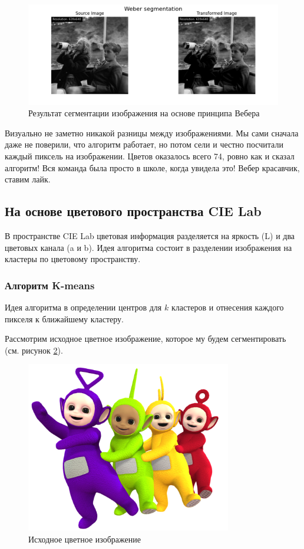 \begin{figure}[ht!]
    \centering
    \includegraphics[width=\textwidth]{../results/Weber segmentation.png}
    \caption{Результат сегментации изображения на основе принципа Вебера}
    \label{img:weber_segmentation}
\end{figure}

Визуально не заметно никакой разницы между изображениями. Мы сами сначала даже не поверили, 
что алгоритм работает, но потом сели и честно посчитали каждый пиксель на изображении. 
Цветов оказалось всего 74, ровно как и сказал алгоритм! Вся команда была просто в школе, когда увидела это! 
Вебер красавчик, ставим лайк. 

\subsection{На основе цветового пространства CIE Lab}

В пространстве CIE Lab цветовая информация разделяется на яркость (L) и два цветовых канала (a и b).
Идея алгоритма состоит в разделении изображения на кластеры по цветовому пространству.

\subsubsection{Алгоритм K-means}

Идея алгоритма в определении центров для $k$ кластеров и отнесения каждого пикселя к ближайшему кластеру.

Рассмотрим исходное цветное изображение, которое му будем сегментировать (см. рисунок \ref{img:source_color}).

\begin{figure}[ht!]
    \centering
    \includegraphics[width=0.8\textwidth]{../puziki.png}
    \caption{Исходное цветное изображение}
    \label{img:source_color}
\end{figure}

